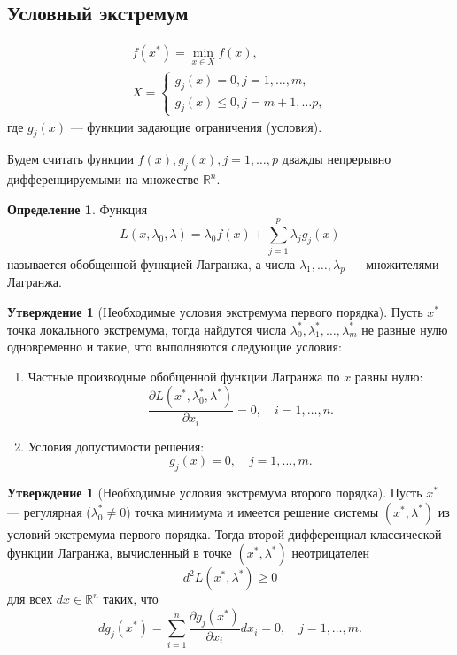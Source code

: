 \documentclass[12pt]{report}
\theoremstyle{definition}
\newtheorem{definition}[theorem]{Определение}
\newtheorem{statement}[theorem]{Утверждение}
\newcommand{\R}{\mathbb R}
\begin{document}
\subsection{Условный экстремум}

\begin{gather*}
f(x^*) = \min_{x \in X} f(x), \\
X = 
\begin{cases}
g_j(x) = 0, j = 1, \dots, m, \\
g_j(x) \le 0, j = m + 1, \dots p,
\end{cases}
\end{gather*}
где $g_j(x)$ --- функции задающие ограничения (условия).

Будем считать функции $f(x), g_j(x), j = 1, \dots, p$ дважды непрерывно
дифференцируемыми на множестве $\R^n$.

\begin{definition}
Функция
$$
L(x, \lambda_0, \lambda) = \lambda_0 f(x) +
\sum\limits_{j = 1}^p \lambda_j g_j(x)
$$
называется обобщенной функцией Лагранжа, а числа
$\lambda_1, \dots, \lambda_p$ --- множителями Лагранжа.
\end{definition}

\begin{statement}[Необходимые условия экстремума первого порядка]
Пусть $x^*$ точка локального экстремума, тогда найдутся числа
$\lambda^*_0, \lambda^*_1, \dots, \lambda^*_m$ не равные нулю одновременно
и такие, что выполняются следующие условия:
\begin{enumerate}
\item Частные производные обобщенной функции Лагранжа по $x$ равны нулю:
  $$
    \dfrac{\partial L(x^*, \lambda^*_0, \lambda^*)}{\partial x_i} = 0, \quad
    i = 1, \dots, n.
  $$
\item Условия допустимости решения:
  $$
    g_j(x) = 0, \quad j = 1, \dots, m.
  $$
\end{enumerate}
\end{statement}

\begin{statement}[Необходимые условия экстремума второго порядка]
Пусть $x^*$ --- регулярная ($\lambda^*_0 \ne 0$) точка минимума и имеется
решение системы $(x^*, \lambda^*)$ из условий экстремума первого порядка.
Тогда второй дифференциал классической функции Лагранжа, вычисленный в
точке $(x^*, \lambda^*)$ неотрицателен
$$
d^2 L(x^*, \lambda^*) \ge 0
$$
для всех $dx \in \R^n$ таких, что
$$
dg_j(x^*) = \sum\limits_{i=1}^n \dfrac{\partial g_j(x^*)}{\partial x_i} dx_i = 0,
\quad j = 1, \dots, m. 
$$
\end{statement}
\end{document}
